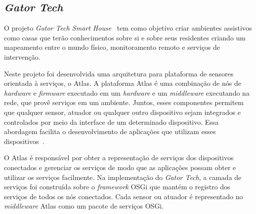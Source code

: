 \subsection{\emph{Gator Tech}}

O projeto \emph{Gator Tech Smart House}~\cite{gatorTech} tem como objetivo criar ambientes assistivos como casas que terão conhecimentos sobre si e sobre seus residentes criando um mapeamento entre o mundo físico, monitoramento remoto e serviços de intervenção.

Neste projeto foi desenvolvida uma arquitetura para plataforma de sensores orientada à serviços, o Atlas. A plataforma Atlas é uma combinação de nós de \emph{hardware} e \emph{firmware} executado em um \emph{hardware} e um \emph{middleware} executando na rede, que provê serviços em um ambiente. Juntos, esses componentes permitem que qualquer sensor, atuador ou qualquer outro dispositivo sejam integrados e controlados por meio da interface de um determinado dispositivo. Essa abordagem facilita o desenvolvimento de aplicações que utilizam esses dispositivos~\cite{gatorTechLessons}. 

O Atlas é responsável por obter a representação de serviços dos dispositivos conectados e gerenciar os serviços de modo que as aplicações possam obter e utilizar os serviços facilmente. Na implementação do \emph{Gator Tech}, a camada de serviços foi construída sobre o \emph{framework} OSGi que mantém o registro dos serviços de todos os nós conectados. Cada sensor ou atuador é representado no \emph{middleware} Atlas como um pacote de serviços OSGi. 